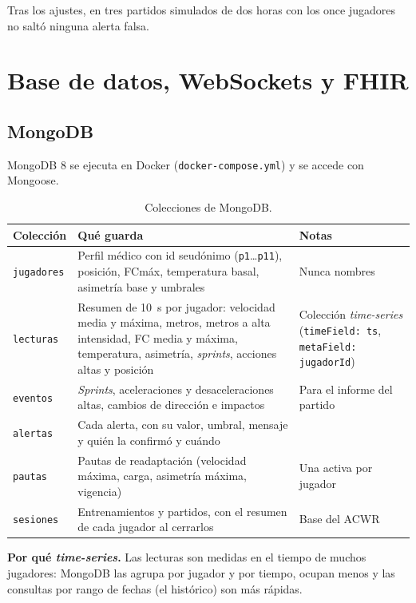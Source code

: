 \documentclass[runningheads]{llncs}
\newcommand{\ruta}[1]{\texttt{#1}}
\begin{document}
Tras los ajustes, en tres partidos simulados de dos horas con los once jugadores no saltó ninguna alerta falsa.

\section{Base de datos, WebSockets y FHIR}

\subsection{MongoDB}

MongoDB 8 se ejecuta en Docker (\ruta{docker-compose.yml}) y se accede con Mongoose.

\begin{table}[!htbp]
\centering
\caption{Colecciones de MongoDB.}\label{tab:colecciones}
\footnotesize
\begin{tabularx}{\textwidth}{p{1.8cm}Lp{3.1cm}}
\toprule
\textbf{Colección} & \textbf{Qué guarda} & \textbf{Notas} \\
\midrule
\texttt{jugadores} & Perfil médico con id seudónimo (\texttt{p1}\ldots\texttt{p11}), posición, FCmáx, temperatura basal, asimetría base y umbrales & Nunca nombres \\
\texttt{lecturas} & Resumen de 10~s por jugador: velocidad media y máxima, metros, metros a alta intensidad, FC media y máxima, temperatura, asimetría, \emph{sprints}, acciones altas y posición & Colección \emph{time-series} (\texttt{timeField: ts}, \texttt{metaField: jugadorId}) \\
\texttt{eventos} & \emph{Sprints}, aceleraciones y desaceleraciones altas, cambios de dirección e impactos & Para el informe del partido \\
\texttt{alertas} & Cada alerta, con su valor, umbral, mensaje y quién la confirmó y cuándo & \\
\texttt{pautas} & Pautas de readaptación (velocidad máxima, carga, asimetría máxima, vigencia) & Una activa por jugador \\
\texttt{sesiones} & Entrenamientos y partidos, con el resumen de cada jugador al cerrarlos & Base del ACWR \\
\bottomrule
\end{tabularx}
\end{table}

\textbf{Por qué \emph{time-series}.} Las lecturas son medidas en el tiempo de muchos jugadores: MongoDB las agrupa por jugador y por tiempo, ocupan menos y las consultas por rango de fechas (el histórico) son más rápidas.
\end{document}
